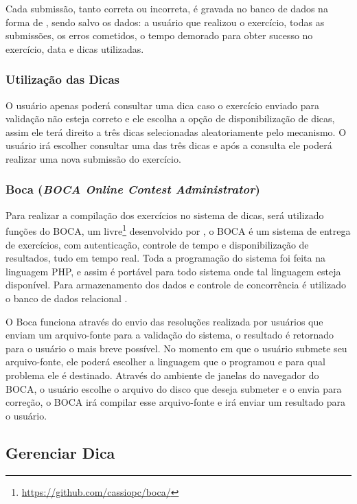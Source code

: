 Cada submissão, tanto correta ou incorreta, é gravada no banco de dados na forma de , sendo salvo os dados: a usuário que realizou o exercício, todas as submissões, os erros cometidos, o tempo demorado para obter sucesso no exercício, data e dicas utilizadas.

\subsubsection{Utilização das Dicas}

O usuário apenas poderá consultar uma dica caso o exercício enviado para validação não esteja correto e ele escolha a opção de disponibilização de dicas, assim ele terá direito a três dicas selecionadas aleatoriamente pelo mecanismo. O usuário irá escolher consultar uma das três dicas e após a consulta ele poderá realizar uma nova submissão do exercício.

\subsubsection{Boca (\textit{BOCA Online Contest Administrator})}

Para realizar a compilação dos exercícios no sistema de dicas, será utilizado funções do BOCA, um  livre\footnote{\url{https://github.com/cassiopc/boca/}} desenvolvido por , o BOCA é um sistema de entrega de exercícios, com autenticação, controle de tempo e disponibilização de resultados, tudo em tempo real. Toda a programação do sistema foi feita na linguagem PHP, e assim é portável para todo sistema onde tal linguagem esteja disponível. Para armazenamento dos dados e controle de concorrência é utilizado o banco de dados relacional . 

O Boca funciona através do envio das resoluções realizada por usuários que enviam um arquivo-fonte para a validação do sistema, o resultado é retornado para o usuário o mais breve possível. No momento em que o usuário submete seu arquivo-fonte, ele poderá escolher a linguagem que o programou e para qual problema ele é destinado. Através do ambiente de janelas do navegador do BOCA, o usuário escolhe o arquivo do disco que deseja submeter e o envia para correção, o BOCA irá compilar esse arquivo-fonte e irá enviar um resultado para o usuário.

\subsection{Gerenciar Dica}

